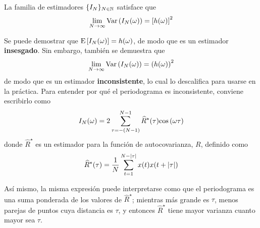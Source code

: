 \begin{proposicion}
La familia de estimadores $\{I_N\}_{N\in\mathbb{N}}$ satisface que
\begin{equation}
\lim_{N\rightarrow \infty} \mathrm{Var}\left( I_N(\omega) \right) = \left[ h(\omega) \right]^{2}
\end{equation}
\end{proposicion}


Se puede demostrar que $\mathrm{E}\left[ I_N(\omega) \right] = h(\omega)$, de modo que es un estimador 
\textbf{insesgado}. Sin embargo, también se demuestra que
\begin{equation*}
\lim_{N\rightarrow \infty} \mathrm{Var}\left( I_N(\omega) \right) = \left( h(\omega) \right)^{2}
\end{equation*}
de modo que es un estimador \textbf{inconsistente}, lo cual lo descalifica para usarse en la 
práctica.
%
Para entender por qué el periodograma es inconsistente, conviene escribirlo como
\begin{equation}
I_N(\omega) = 2 \sum_{\tau = -(N-1)}^{N-1} \widehat{R}^{\star}(\tau) \mathrm{cos}\left( \omega \tau \right)
\label{txt_periodograma2}
\end{equation}
%
donde $\widehat{R}^{\star}$ es un estimador para la función de autocovarianza, $R$, definido como
\begin{equation}
\widehat{R}^{\star} (\tau) = \frac{1}{N} \sum_{t = 1}^{N-\left| \tau \right|} x(t) x(t+\left| \tau \right|)
\end{equation}

%
%
Así mismo, la misma expresión puede interpretarse como que el periodograma es una suma ponderada de 
los valores de $\widehat{R}^{\star}$; mientras más grande es $\tau$, menos parejas de puntos cuya 
distancia es $\tau$, y entonces $\widehat{R}^{\star}$ tiene mayor varianza cuanto mayor sea $\tau$. 

